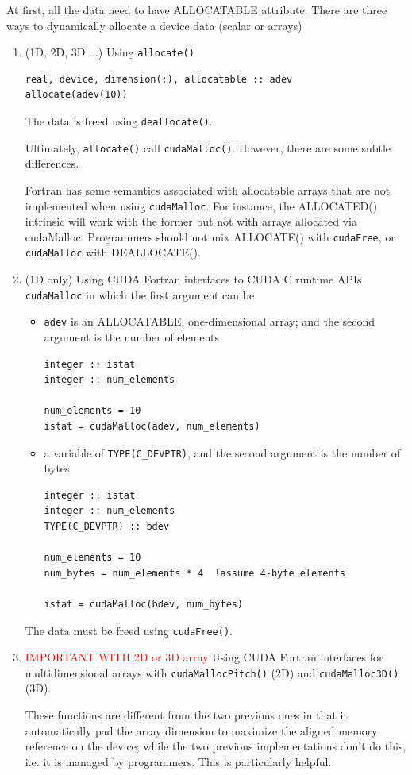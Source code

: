 At first, all the data need to have ALLOCATABLE attribute.  There are
three ways to dynamically allocate a device data (scalar or arrays)
\begin{enumerate}
\item (1D, 2D, 3D ...) Using \verb!allocate()!
\begin{lstlisting}
real, device, dimension(:), allocatable :: adev
allocate(adev(10))
\end{lstlisting}
  The data is freed using \verb!deallocate()!.

  \begin{framed}
    Ultimately, \verb!allocate()! call \verb!cudaMalloc()!. However,
    there are some subtle differences. 

    Fortran has some semantics associated with allocatable arrays that
    are not implemented when using \verb!cudaMalloc!. For instance,
    the ALLOCATED() intrinsic will work with the former but not with
    arrays allocated via cudaMalloc.  Programmers should not mix
    ALLOCATE() with \verb!cudaFree!, or \verb!cudaMalloc! with
    DEALLOCATE().
  \end{framed}

\item (1D only) Using CUDA Fortran interfaces to CUDA C runtime APIs
  \verb!cudaMalloc! in which the first argument can be
  \begin{itemize}
  \item \verb!adev! is an ALLOCATABLE, one-dimensional array; and the
    second argument is the number of elements
\begin{lstlisting}
integer :: istat
integer :: num_elements

num_elements = 10
istat = cudaMalloc(adev, num_elements)
\end{lstlisting}
    
  \item a variable of \verb!TYPE(C_DEVPTR)!, and the second argument
    is the number of bytes
\begin{lstlisting}
integer :: istat
integer :: num_elements
TYPE(C_DEVPTR) :: bdev

num_elements = 10
num_bytes = num_elements * 4  !assume 4-byte elements

istat = cudaMalloc(bdev, num_bytes)
\end{lstlisting}
  \end{itemize}
  The data must be freed using \verb!cudaFree()!.
  
\item \textcolor{red}{IMPORTANT WITH 2D or 3D array} Using CUDA
  Fortran interfaces for multidimensional arrays with
  \verb!cudaMallocPitch()! (2D) and \verb!cudaMalloc3D()! (3D). 

  These functions are different from the two previous ones in that it
  automatically pad the array dimension to maximize the aligned memory
  reference on the device; while the two previous implementations
  don't do this, i.e. it is managed by programmers. This is
  particularly helpful. 
\end{enumerate}

